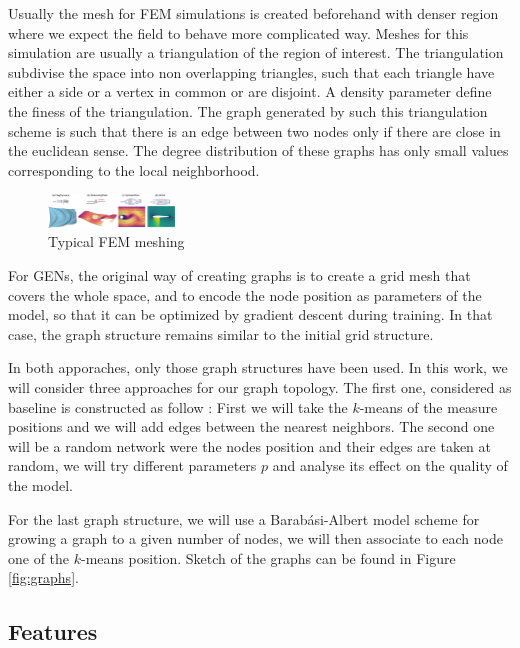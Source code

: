 \documentclass[a4paper,10pt]{article}
\begin{document}
Usually the mesh for FEM simulations is created beforehand with denser region where we expect the field to behave more complicated way. Meshes for this simulation are usually a triangulation of the region of interest. The triangulation subdivise the space into non overlapping triangles, such that each triangle have either a side or a vertex in common or are disjoint. A density parameter define the finess of the triangulation. The graph generated by such this triangulation scheme is such that there is an edge between two nodes only if there are close in the euclidean sense. The degree distribution of these graphs has only small values corresponding to the local neighborhood.

\begin{figure}
  \centering
  \includegraphics[trim={780 0 300 50},clip,width=0.3\textwidth]{figs/mesh-dataset}
  \caption{Typical FEM meshing \cite{pfaff2020learning}}
\end{figure}

For GENs, the original way of creating graphs is to create a grid mesh that covers the whole space, and to encode the node position as parameters of the model, so that it can be optimized by gradient descent during training. In that case, the graph structure remains similar to the initial grid structure.

In both apporaches, only those graph structures have been used. In this work, we will consider three approaches for our graph topology. The first one, considered as baseline is constructed as follow : First we will take the $k$-means of the measure positions and we will add edges between the nearest neighbors. The second one will be a random network were the nodes position and their edges are taken at random, we will try different parameters $p$ and analyse its effect on the quality of the model.

For the last graph structure, we will use a Barab\'asi-Albert model scheme for growing a graph to a given number of nodes, we will then associate to each node one of the $k$-means position. Sketch of the graphs can be found in Figure \ref{fig:graphs}.


\subsection{Features}
\end{document}
